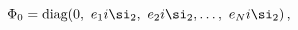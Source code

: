 \begin{equation}
\Phi _{0}={\mbox {diag}}(0,\ e_{1}i\si_{2},\ e_{2}i\si_{2},\ldots ,\ e_{N}i%
\si_{2})\,,
\end{equation}

